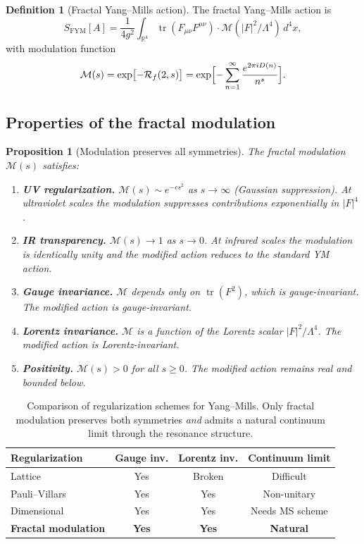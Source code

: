 \documentclass[11pt,a4paper]{article}
\theoremstyle{plain}
\newtheorem{proposition}[theorem]{Proposition}
\theoremstyle{definition}
\newtheorem{definition}[theorem]{Definition}
\DeclareMathOperator{\Tr}{tr}
\newcommand{\R}{\mathbb{R}}
\newcommand{\Rf}{\mathcal{R}_f}
\newcommand{\Mfm}{\mathcal{M}}
\begin{document}
\begin{definition}[Fractal Yang--Mills action]
\label{def:fym-action}
The fractal Yang--Mills action is
\[
S_{\mathrm{FYM}}[A] = \frac{1}{4g^{2}} \int_{\R^{4}}
\Tr(F_{\mu\nu}F^{\mu\nu}) \cdot \Mfm(|F|^{2}/\Lambda^{4})\, d^{4}x,
\]
with modulation function
\[
\Mfm(s) = \exp\bigl[-\Rf(2, s)\bigr] =
\exp\Bigl[-\sum_{n=1}^{\infty}
\frac{e^{2\pi i D(n)}}{n^{s}}\Bigr].
\]
\end{definition}

\subsection{Properties of the fractal modulation}

\begin{proposition}[Modulation preserves all symmetries]
\label{prop:modulation-properties}
The fractal modulation $\Mfm(s)$ satisfies:
\begin{enumerate}[label=(\textbf{M\arabic*}),leftmargin=*]
\item \textbf{UV regularization.} $\Mfm(s) \sim e^{-cs^{2}}$ as
$s \to \infty$ (Gaussian suppression). At ultraviolet scales the
modulation suppresses contributions exponentially in $|F|^{4}$.
\item \textbf{IR transparency.} $\Mfm(s) \to 1$ as $s \to 0$. At
infrared scales the modulation is identically unity and the modified
action reduces to the standard YM action.
\item \textbf{Gauge invariance.} $\Mfm$ depends only on $\Tr(F^{2})$,
which is gauge-invariant. The modified action is gauge-invariant.
\item \textbf{Lorentz invariance.} $\Mfm$ is a function of the
Lorentz scalar $|F|^{2}/\Lambda^{4}$. The modified action is
Lorentz-invariant.
\item \textbf{Positivity.} $\Mfm(s) > 0$ for all $s \ge 0$. The
modified action remains real and bounded below.
\end{enumerate}
\end{proposition}

\begin{table}[h]
\centering
\begin{tabular}{lccc}
\toprule
\textbf{Regularization} & \textbf{Gauge inv.} & \textbf{Lorentz inv.} & \textbf{Continuum limit} \\
\midrule
Lattice & Yes & Broken & Difficult \\
Pauli--Villars & Yes & Yes & Non-unitary \\
Dimensional & Yes & Yes & Needs MS scheme \\
\textbf{Fractal modulation} & \textbf{Yes} & \textbf{Yes} & \textbf{Natural} \\
\bottomrule
\end{tabular}
\caption{Comparison of regularization schemes for Yang--Mills. Only
fractal modulation preserves both symmetries \emph{and} admits a
natural continuum limit through the resonance structure.}
\label{tab:regularizations}
\end{table}
\end{document}
